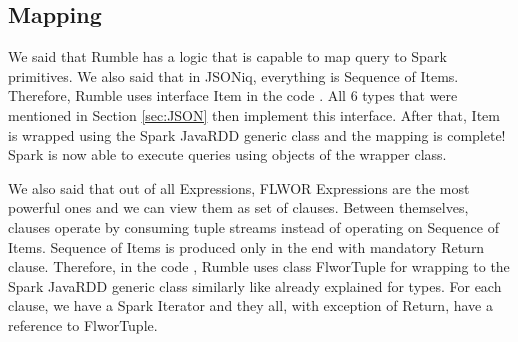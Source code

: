 \subsection{Mapping}
We said that Rumble has a logic that is capable to map query to Spark primitives. We also said that in JSONiq, everything is Sequence of Items. Therefore, Rumble uses interface Item in the code \cite{RumbleRepository}. All 6 types that were mentioned in Section \ref{sec:JSON} then implement this interface. After that, Item is wrapped using the Spark JavaRDD generic class and the mapping is complete! Spark is now able to execute queries using objects of the wrapper class.

We also said that out of all Expressions, FLWOR Expressions are the most powerful ones and we can view them as set of clauses. Between themselves, clauses operate by consuming tuple streams instead of operating on Sequence of Items. Sequence of Items is produced only in the end with mandatory Return clause. Therefore, in the code \cite{RumbleRepository}, Rumble uses class FlworTuple for wrapping to the Spark JavaRDD generic class similarly like already explained for types. For each clause, we have a Spark Iterator and they all, with exception of Return, have a reference to FlworTuple. 

